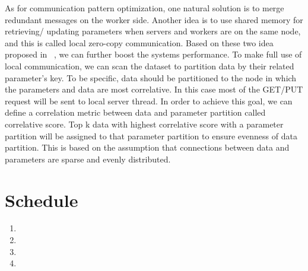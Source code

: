 \documentclass{article}
\begin{document}
\noindent As for communication pattern optimization, one natural solution is to merge redundant messages on the worker side. Another idea is to use shared memory for retrieving/ updating parameters when servers and workers are on the same node, and this is called local zero-copy communication. Based on these two idea proposed in ~\cite{huang2018flexps}, we can further boost the systems performance. To make full use of local communication, we can scan the dataset to partition data by their related parameter’s key. To be specific, data should be partitioned to the node in which the parameters and data are most correlative. In this case most of the GET/PUT request will be sent to local server thread. In order to achieve this goal, we can define a correlation metric between data and parameter partition called correlative score. Top k data with highest correlative score with a parameter partition will be assigned to that parameter partition to ensure evenness of data partition. This is based on the assumption that connections between data and parameters are sparse and evenly distributed.


\section{Schedule}

\begin{enumerate}
\item {}
\item {}
\item {}
\item {}
\end{enumerate}



\end{document}
